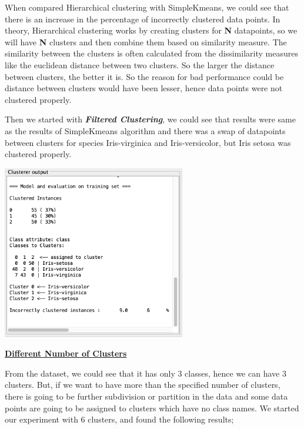 \documentclass[a4paper,10pt]{article}
\begin{document}
When compared Hierarchical clustering with SimpleKmeans, we could see that there is an increase in the percentage
of incorrectly clustered data points. In theory, Hierarchical clustering works by creating clusters for \textbf{N}
datapoints, so we will have \textbf{N} clusters and then combine them based on similarity measure. The similarity 
between the clusters is often calculated from the dissimilarity measures like the euclidean distance between two 
clusters. So the larger the distance between clusters, the better it is. So the reason for bad performance
could be distance between clusters would have been lesser, hence data points were not clustered properly.
\par
Then we started with \textbf{\textit{Filtered Clustering}}, we could see that results were same as the results of
SimpleKmeans algorithm and there was a swap of datapoints between clusters for species Iris-virginica and Iris-versicolor,
but Iris setosa was clustered properly.
\begin{center}
  \includegraphics[width=80mm,scale=0.10]{Filtered_Clustering.png}
\end{center}
\par
\textbf{\underline{Different Number of Clusters}} \par
From the dataset, we could see that it has only 3 classes, hence we can have 3 clusters. But, if we want to have 
more than the specified number of clusters, there is going to be further subdivision or partition in the data and 
some data points are going to be assigned to clusters which have no class names.
\newpage
We started our experiment with 6 clusters, and found the following results;
\end{document}
